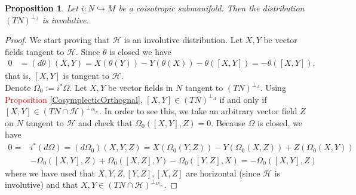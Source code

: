 \documentclass[12pt]{article}
\newtheorem{prop}{Proposition}[section]
\newtheorem{Def}{Definition}[section]
\newtheorem{remark}{Remark}[section]
\begin{document}
\begin{prop} Let $ i:N \hookrightarrow M $ be a coisotropic submanifold. Then the
distribution $(TN)^{\perp_\Lambda}$ is involutive. \end{prop} 

\begin{proof} We start proving that $\mathcal{H}$ is an involutive distribution. Let $X,Y$ be vector fields tangent to $\mathcal{H}$. Since $\theta$ is closed we have 
\begin{align*}
0 &= (d\theta)(X,Y) = X(\theta(Y)) - Y(\theta(X)) - \theta([X,Y]) = - \theta([X,Y]),
\end{align*}
that is, $[X,Y]$ is tangent to $\mathcal{H}.$\\

 Denote $\Omega_0:= i^* \Omega$.
 Let $X,Y$ be vector fields in $N$ tangent to $(TN)^{\perp_\Lambda}$. Using \textcolor{red}{Proposition \ref{CosymplecticOrthognal}}, $[X,Y] \in (TN)^{\perp_\Lambda}$ if and only if $[X,Y] \in (TN \cap \mathcal{H})^{\perp_{\Omega |_\mathcal{H}}}$. In order to see this,  we take an arbitrary vector field $Z$ on $N$ tangent to $\mathcal{H}$ and check that $\Omega_0([X,Y],Z) = 0$. Because $\Omega$ is closed, we have
\begin{align*} 0 =& i^*( d\Omega)=  ( d\Omega_0)(X,Y,Z) = X(\Omega_0(Y,Z)) - Y(\Omega_0(X,Z)) + Z( \Omega_0(X,Y)) \\
&- \Omega_0([X,Y],Z) + \Omega_0([X,Z],Y) - \Omega_0([Y,Z],X) = - \Omega_0([X,Y],Z)\end{align*}
 where we have used that $X,Y,Z,[Y,Z], [X,Z]$ are horizontal (since $\mathcal{H}$ is involutive) and that $X,Y \in  (TN \cap \mathcal{H})^{\perp_{\Omega |_\mathcal{H}}}$. \end{proof}
\end{document}
